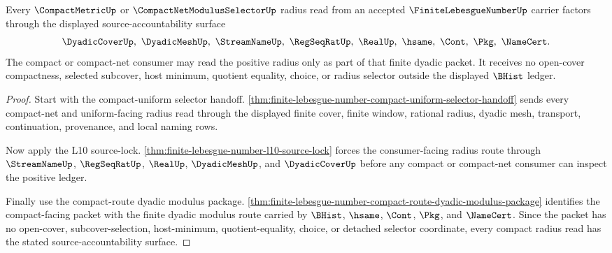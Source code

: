 \begin{theorem}
\label{thm:finite-lebesgue-number-compact-radius-source-accountability}
Every $\CompactMetricUp$ or $\CompactNetModulusSelectorUp$ radius read from an accepted $\FiniteLebesgueNumberUp$ carrier factors through the displayed source-accountability surface
$$
\DyadicCoverUp,\ \DyadicMeshUp,\ \StreamNameUp,\ \RegSeqRatUp,\ \RealUp,\ \hsame,\ \Cont,\ \Pkg,\ \NameCert .
$$
The compact or compact-net consumer may read the positive radius only as part of that finite dyadic packet. It receives no open-cover compactness, selected subcover, host minimum, quotient equality, choice, or radius selector outside the displayed $\BHist$ ledger.
\end{theorem}
\begin{proof}
Start with the compact-uniform selector handoff. \autoref{thm:finite-lebesgue-number-compact-uniform-selector-handoff} sends every compact-net and uniform-facing radius read through the displayed finite cover, finite window, rational radius, dyadic mesh, transport, continuation, provenance, and local naming rows.

Now apply the L10 source-lock. \autoref{thm:finite-lebesgue-number-l10-source-lock} forces the consumer-facing radius route through $\StreamNameUp$, $\RegSeqRatUp$, $\RealUp$, $\DyadicMeshUp$, and $\DyadicCoverUp$ before any compact or compact-net consumer can inspect the positive ledger.

Finally use the compact-route dyadic modulus package. \autoref{thm:finite-lebesgue-number-compact-route-dyadic-modulus-package} identifies the compact-facing packet with the finite dyadic modulus route carried by $\BHist$, $\hsame$, $\Cont$, $\Pkg$, and $\NameCert$. Since the packet has no open-cover, subcover-selection, host-minimum, quotient-equality, choice, or detached selector coordinate, every compact radius read has the stated source-accountability surface.
\end{proof}

